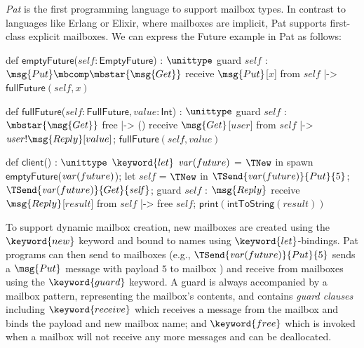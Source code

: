 \emph{Pat} \cite{fowlerSpecialDeliveryProgramming2023} is the first programming language to support mailbox types.
In contrast to languages like Erlang or Elixir, where mailboxes are implicit,
Pat supports first-class explicit mailboxes. 
We can express the Future example in Pat as follows:

\begin{minipage}{0.59\textwidth}
\begin{pat}[firstnumber=1]
def $\textsf{emptyFuture}$($\mathit{self} : \mathsf{EmptyFuture}$) : $\unittype$ {
  guard $\mathit{self}$ : $\msg{Put} \mbcomp \mbstar{\msg{Get}}$ {
      receive $\msg{Put}$[$x$] from $\mathit{self}$ |->
      $\mathsf{fullFuture}(\mathit{self}, x)$
  }
}
\end{pat}
\begin{pat}[firstnumber=7]
def $\textsf{fullFuture}$($\mathit{self} : \mathsf{FullFuture}, \mathit{value} : \mathsf{Int}$) : $\unittype$ {
  guard $\mathit{self}$ : $\mbstar{\msg{Get}}$ {
    free |-> ()
    receive $\msg{Get}$[$\mathit{user}$] from $\mathit{self}$ |->
        $\mathit{user}\mathsf{!}\msg{Reply}[value]$;
      $\mathsf{fullFuture}(\mathit{self}, \mathit{value})$
  }
}
\end{pat}
\end{minipage}
\begin{minipage}{0.5\textwidth}
\begin{pat}[firstnumber=15]
def $\textsf{client}$() : $\unittype$ {
  $\keyword{let}$ ${\it var}(future)$ = $\TNew$ in
  spawn $\textsf{emptyFuture}$(${\it var}(future)$);
  let $\mathit{self}$ = $\TNew$ in
  $\TSend{\var{future}}{Put}{5}$;
  $\TSend{\var{future}}{Get}{\mathit{self}}$;
  guard $\mathit{self}$ : $\msg{Reply}$ {
      receive $\msg{Reply}$[$\mathit{result}$]
    from $\mathit{self}$ |->
      free $\mathit{self}$;
      $\mathsf{print}(\mathsf{intToString}(\mathit{result}))$
  }
}
\end{pat}
\end{minipage}
\vspace{.2cm}

To support dynamic mailbox creation, new mailboxes are created using the
$\keyword{new}$ keyword and bound to names using $\keyword{let}$-bindings.
Pat programs can then send to mailboxes (e.g., $\TSend{\var{future}}{Put}{5}$
sends a $\msg{Put}$ message with payload $5$ to mailbox ) and
receive from mailboxes using the $\keyword{guard}$ keyword.
A guard is always accompanied by a mailbox pattern, representing the mailbox's
contents, and contains \emph{guard clauses} including $\keyword{receive}$ which
receives a message from the mailbox and binds the payload and new mailbox name;
and $\keyword{free}$ which is invoked when a mailbox will not receive any more
messages and can be deallocated.

